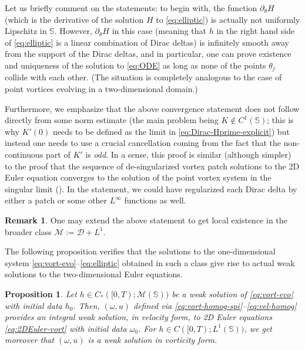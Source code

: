 \documentclass[10pt]{amsart}
\theoremstyle{plain}
\newtheorem{proposition}[theorem]{Proposition}
\theoremstyle{definition}
\newtheorem{remark}[theorem]{Remark}
\let\tht\theta
\let\omg\omega
\newcommand{\bbS}{\mathbb S}
\newcommand{\calD}{\mathcal D}
\newcommand{\calM}{\mathcal M}
\begin{document}
Let us briefly comment on the statements: to begin with, the function $\partial_{\theta} H$ (which is the derivative of the solution $H$ to \eqref{eq:elliptic}) is actually not uniformly Lipschitz in $\bbS$. However, $\partial_{\theta} H$ in this case (meaning that $h$ in the right hand side of \eqref{eq:elliptic} is a linear combination of Dirac deltas) is infinitely smooth away from the support of the Dirac deltas, and in particular, one can prove existence and uniqueness of the solution to \eqref{eq:ODE} as long as none of the points $\tht_{j}$ collide with each other. (The situation is completely analogous to the case of point vortices evolving in a two-dimensional domain.)

Furthermore, we emphasize that the above convergence statement does not follow directly from some norm estimate (the main problem being $K \notin C^1(\bbS)$; this is why $K'(0)$ needs to be defined as the limit in \eqref{eq:Dirac-Hprime-explicit}) but instead one needs to use a crucial cancellation coming from the fact that the non-continuous part of $K'$ is \textit{odd}. In a sense, this proof is similar (although simpler) to the proof that the sequence of de-singularized vortex patch solutions to the 2D Euler equation converges to the solution of the point vortex system in the singular limit (\cite{MP}). In the statement, we could have regularized each Dirac delta by either a patch or some other $L^\infty$ functions as well.

\begin{remark} One may extend the above statement to get local existence in the broader class $\calM := \calD+L^1$.
\end{remark}

The following proposition verifies that the solutions to the one-dimensional system \eqref{eq:vort-evo}--\eqref{eq:elliptic} obtained in such a class give rise to actual weak solutions to the two-dimensional Euler equations.
\begin{proposition}\label{prop:back-to-2D}
Let $h \in C_*([0,T);\calM(\bbS))$ be a weak solution of \eqref{eq:vort-evo} with initial data $h_0$. Then, $(\omg, u)$ defined via \eqref{eq:vort-homog-spi}--\eqref{eq:vel-homog} provides an integral weak solution, in velocity form, to 2D Euler equations \eqref{eq:2DEuler-vort} with initial data $\omg_0$. For $h \in C([0,T);L^1(\bbS))$, we get moreover that $(\omg, u)$ is a weak solution in vorticity form.
\end{proposition}
\end{document}

